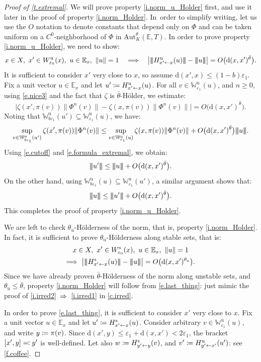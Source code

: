 \documentclass[10pt]{amsart}
\def\vcentcolon{\mathrel{\mathop\ordinarycolon}}
\providecommand\ordinarycolon{:}
\providecommand*\coloneqq{\vcentcolon\mathrel{\mkern-1.2mu}=}
\providecommand*\eqqcolon{=\mathrel{\mkern-1.2mu}\vcentcolon}
\let\eqcolon\eqqcolon
\newcommand\implique{\mathchoice{\Longrightarrow}{\Rightarrow}{\Rightarrow}{\Rightarrow}}
\theoremstyle{plain}
\theoremstyle{definition}
\newcommand{\tribar}[1]{\mathopen{| {\kern -1.5pt} | {\kern -1.5pt} |} {#1}
\mathclose{| {\kern -1.5pt} | {\kern -1.5pt} |}}
\newcommand{\EE}{\mathbb{E}}
\newcommand{\WW}{\mathbb{W}}
\newcommand{\dd}{\mathrm{d}}
\newcommand{\uu}{\mathrm{u}}
\renewcommand{\ss}{\mathrm{s}}
\newcommand{\Aut}{\mathrm{Aut}}
\let\epsilon\varepsilon
\begin{document}
\begin{proof}[Proof of \cref{t.extremal}]
We will prove property \eqref{i.norm_u_Holder} first, and use it later in the proof of property \eqref{i.norm_Holder}.
In~order to simplify writing, let us use the $O$ notation to denote constants that depend only on $\Phi$ and can be taken uniform on a $C^0$-neighborhood of $\Phi$ in $\Aut^\theta_K(\EE,T)$.
In order to prove property \eqref{i.norm_u_Holder}, we need to show:
\[
x \in X, \ x' \in W^\uu_{\epsilon_0}(x), \ u \in \EE_x, \ \|u\| = 1 \quad \implique \quad
\big| \tribar{H^\uu_{x' \gets x}(u)} - \tribar{u} \big| = O \big( \dd(x,x')^{\bar \theta} \big).
\]
It is sufficient to consider $x'$ very close to $x$, so assume $\dd(x',x)\le (1-b)\epsilon_1$.
Fix a unit vector $u \in \EE_x$ and let $u' \coloneqq H^\uu_{x' \gets x}(u)$.
For all $v \in \WW^\uu_{\epsilon_1}(u)$, and $n\ge 0$, using \eqref{e.nice3} and the fact that
$\zeta$ is $\bar\theta$-Hölder, we estimate:
\[
\Big| \zeta(x', \pi(v)) \|\Phi^n(v)\| - \zeta(x,\pi(v)) \|\Phi^n(v)\| \Big| = O \big( \dd(x,x')^{\bar \theta} \big).
\]
Noting that $\WW^\uu_{b\epsilon_1}(u') \subseteq \WW^\uu_{\epsilon_1}(u)$, we have:
\[
\sup_{v \in \WW^\uu_{b\epsilon_1}(u')} \zeta(x', \pi(v)) \|\Phi^n(v)\| \le
\sup_{v \in \WW^\uu_{ \epsilon_1}(u )} \zeta(x, \pi(v)) \|\Phi^n(v)\| + O \big( \dd(x,x')^{\bar\theta} \big) \tribar{u}.
\]
Using \eqref{e.cutoff} and \eqref{e.formula_extremal}, we obtain:
\[
\tribar{u'} \le \tribar{u} + O \big( \dd(x,x')^{\bar \theta} \big).
\]
On the other hand, using $\WW^\uu_{b\epsilon_1}(u) \subseteq \WW^\uu_{\epsilon_1}(u')$, a similar argument shows that:
\[
\tribar{u} \le \tribar{u'} + O \big( \dd(x,x')^{\bar \theta} \big).
\]
This completes the proof of property \eqref{i.norm_u_Holder}.

We are left to check $\theta_\uu$-Hölderness of the norm, that is, property \eqref{i.norm_Holder}.
In fact, it is sufficient to prove $\theta_\uu$-Hölderness along stable sets, that is:
\begin{multline}\label{e.last_thing}
x \in X, \ x' \in W^\ss_{\epsilon_0}(x), \ u \in \EE_x, \ \|u\|=1 \\ \implique \
\big| \tribar{H^\ss_{x' \gets x}(u) } - \tribar{u} \big| = O \big( \dd(x,x')^{\theta_\uu} \big).
\end{multline}
Since we have already proven $\bar\theta$-Hölderness of the norm along unstable sets, and $\theta_\uu \le \bar\theta$,
property \eqref{i.norm_Holder} will follow from \eqref{e.last_thing}: just mimic the proof of \eqref{i.irred2}~$\implique$~\eqref{i.irred1} in \cref{c.irred}.

In order to prove \eqref{e.last_thing}, it is sufficient to consider $x'$ very close to $x$.
Fix a unit vector $u \in \EE_x$ and let $u' \coloneqq H^\ss_{x' \gets x}(u)$.
Consider arbitrary $v \in \WW^\uu_{\epsilon_1}(u)$, and write $y \coloneqq \pi(v)$.
Since $\dd(x',y) \le \epsilon_1 + \dd(x,x') < 2\epsilon_1$, the bracket $[x',y] \eqcolon y'$ is well-defined.
Let also $w \coloneqq H^\ss_{y' \gets y}(v)$, and $v' \coloneqq H^\uu_{y' \gets x'}(u')$: see \cref{f.coffee}.


\end{proof}
\end{document}
